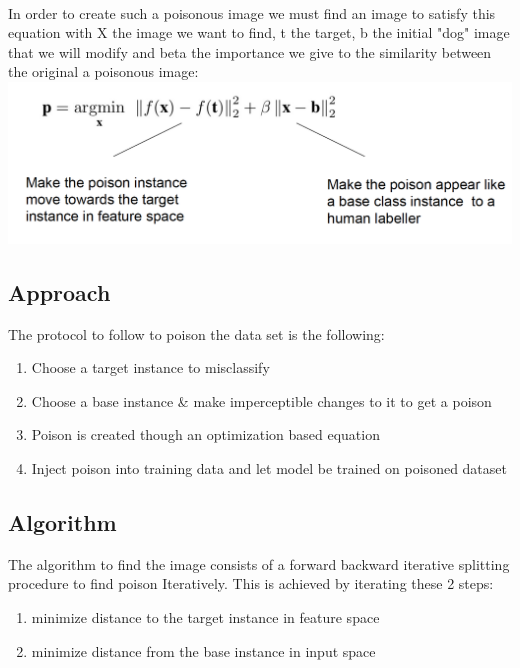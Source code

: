 \documentclass[twoside]{article}
\begin{document}
\paragraph{}
In order to create such a poisonous image we must find an image to satisfy this equation with X the image we want to find, t the target, b the initial "dog" image that we will modify and beta the importance we give to the similarity between the original a poisonous image: \\
\includegraphics[scale=0.3]{Formula.png}

\subsection{Approach}
The protocol to follow to poison the data set is the following:

\begin{enumerate}
  \item Choose a target instance to misclassify
  \item Choose a base instance \& make imperceptible changes to it to get a poison
  \item Poison is created though an optimization based equation
  \item Inject poison into training data and let model be trained on poisoned dataset
\end{enumerate}

\subsection{Algorithm}
The algorithm to find the image consists of a forward backward iterative splitting procedure to find poison Iteratively. This is achieved by iterating these 2 steps:



\begin{enumerate}
  \item minimize distance to the target instance in feature space
  \item minimize distance from the base instance  in input space
\end{enumerate}
\newpage
\end{document}
